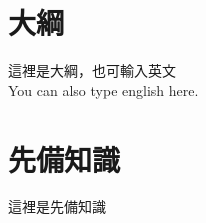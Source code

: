 \documentclass[book, oneside, 12pt]{article}
\begin{document}
\begin{CJK*}{UTF8}{bsmi} %
	
	\section{大綱}
	這裡是大綱，也可輸入英文 \\
	You can also type english here.
	
	\section{先備知識}
	這裡是先備知識
	
\end{CJK*}
\end{document}
